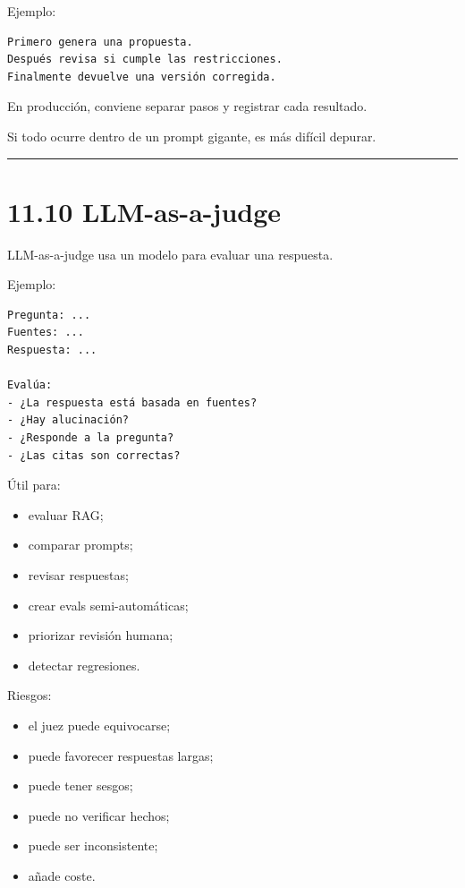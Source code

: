 Ejemplo:

\begin{lstlisting}
Primero genera una propuesta.
Después revisa si cumple las restricciones.
Finalmente devuelve una versión corregida.
\end{lstlisting}

En producción, conviene separar pasos y registrar cada resultado.

Si todo ocurre dentro de un prompt gigante, es más difícil depurar.

\begin{center}\rule{0.5\linewidth}{0.5pt}\end{center}

\section{11.10 LLM-as-a-judge}\label{llm-as-a-judge-1}

LLM-as-a-judge usa un modelo para evaluar una respuesta.

Ejemplo:

\begin{lstlisting}
Pregunta: ...
Fuentes: ...
Respuesta: ...

Evalúa:
- ¿La respuesta está basada en fuentes?
- ¿Hay alucinación?
- ¿Responde a la pregunta?
- ¿Las citas son correctas?
\end{lstlisting}

Útil para:

\begin{itemize}
\tightlist
\item
  evaluar RAG;
\item
  comparar prompts;
\item
  revisar respuestas;
\item
  crear evals semi-automáticas;
\item
  priorizar revisión humana;
\item
  detectar regresiones.
\end{itemize}

Riesgos:

\begin{itemize}
\tightlist
\item
  el juez puede equivocarse;
\item
  puede favorecer respuestas largas;
\item
  puede tener sesgos;
\item
  puede no verificar hechos;
\item
  puede ser inconsistente;
\item
  añade coste.
\end{itemize}

